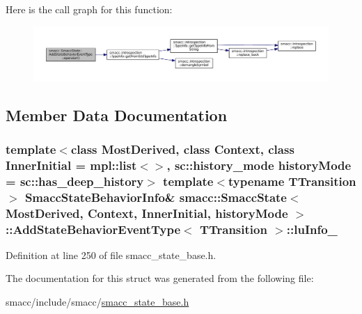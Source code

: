 Here is the call graph for this function\+:
\nopagebreak
\begin{figure}[H]
\begin{center}
\leavevmode
\includegraphics[width=350pt]{structsmacc_1_1SmaccState_1_1AddStateBehaviorEventType_ad20a68a7e420fd24cdd637bfd53e5315_cgraph}
\end{center}
\end{figure}




\subsection{Member Data Documentation}
\subsubsection[{\texorpdfstring{lu\+Info\+\_\+}{luInfo_}}]{\setlength{\rightskip}{0pt plus 5cm}template$<$class Most\+Derived, class Context, class Inner\+Initial = mpl\+::list$<$$>$, sc\+::history\+\_\+mode history\+Mode = sc\+::has\+\_\+deep\+\_\+history$>$ template$<$typename T\+Transition $>$ {\bf Smacc\+State\+Behavior\+Info}\& {\bf smacc\+::\+Smacc\+State}$<$ Most\+Derived, Context, Inner\+Initial, history\+Mode $>$\+::{\bf Add\+State\+Behavior\+Event\+Type}$<$ T\+Transition $>$\+::lu\+Info\+\_\+}\hypertarget{structsmacc_1_1SmaccState_1_1AddStateBehaviorEventType_a982bba2f8e7058bae146bf456e633719}{}\label{structsmacc_1_1SmaccState_1_1AddStateBehaviorEventType_a982bba2f8e7058bae146bf456e633719}


Definition at line 250 of file smacc\+\_\+state\+\_\+base.\+h.



The documentation for this struct was generated from the following file\+:\begin{DoxyCompactItemize}
\item 
smacc/include/smacc/\hyperlink{smacc__state__base_8h}{smacc\+\_\+state\+\_\+base.\+h}\end{DoxyCompactItemize}
